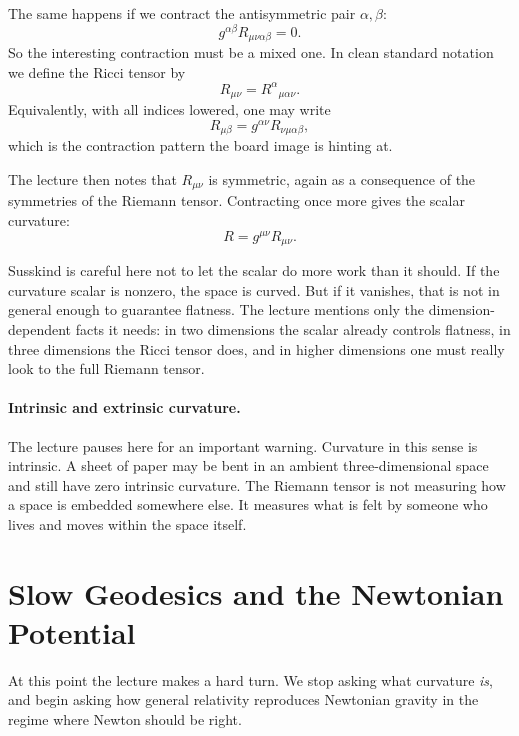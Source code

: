 The same happens if we contract the antisymmetric pair \(\alpha,\beta\):
\begin{equation}
g^{\alpha\beta}R_{\mu\nu\alpha\beta}=0.
\end{equation}
So the interesting contraction must be a mixed one. In clean standard notation we define the Ricci tensor by
\begin{equation}
R_{\mu\nu}
=
R^\alpha{}_{\mu\alpha\nu}.
\end{equation}
Equivalently, with all indices lowered, one may write
\begin{equation}
R_{\mu\beta}
=
g^{\alpha\nu}R_{\nu\mu\alpha\beta},
\end{equation}
which is the contraction pattern the board image is hinting at.

The lecture then notes that \(R_{\mu\nu}\) is symmetric, again as a consequence of the symmetries of the Riemann tensor. Contracting once more gives the scalar curvature:
\begin{equation}
R=g^{\mu\nu}R_{\mu\nu}.
\end{equation}

Susskind is careful here not to let the scalar do more work than it should. If the curvature scalar is nonzero, the space is curved. But if it vanishes, that is not in general enough to guarantee flatness. The lecture mentions only the dimension-dependent facts it needs: in two dimensions the scalar already controls flatness, in three dimensions the Ricci tensor does, and in higher dimensions one must really look to the full Riemann tensor.

\paragraph{Intrinsic and extrinsic curvature.}
The lecture pauses here for an important warning. Curvature in this sense is intrinsic. A sheet of paper may be bent in an ambient three-dimensional space and still have zero intrinsic curvature. The Riemann tensor is not measuring how a space is embedded somewhere else. It measures what is felt by someone who lives and moves within the space itself.

\section{Slow Geodesics and the Newtonian Potential}

At this point the lecture makes a hard turn. We stop asking what curvature \emph{is}, and begin asking how general relativity reproduces Newtonian gravity in the regime where Newton should be right.

